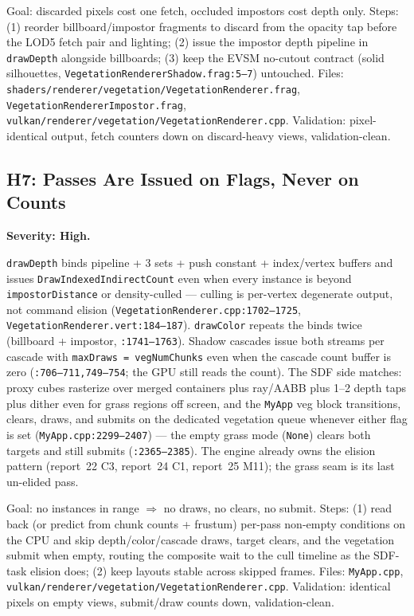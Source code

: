 \documentclass[11pt,a4paper]{article}
\begin{document}
\begin{tcolorbox}[promptbox={Prompt --- H6: cheap-first discard, impostor depth prepass}]
Goal: discarded pixels cost one fetch, occluded impostors cost depth only.
Steps: (1) reorder billboard/impostor fragments to discard from the opacity
tap before the LOD5 fetch pair and lighting; (2) issue the impostor depth
pipeline in \texttt{drawDepth} alongside billboards; (3) keep the EVSM
no-cutout contract (solid silhouettes, \texttt{VegetationRendererShadow.frag:5--7})
untouched. Files: \texttt{shaders/renderer/vegetation/VegetationRenderer.frag},
\texttt{VegetationRendererImpostor.frag},
\texttt{vulkan/renderer/vegetation/VegetationRenderer.cpp}. Validation:
pixel-identical output, fetch counters down on discard-heavy views,
validation-clean.
\end{tcolorbox}

\subsection{H7: Passes Are Issued on Flags, Never on Counts}

\textbf{Severity: High.}

\texttt{drawDepth} binds pipeline + 3 sets + push constant + index/vertex
buffers and issues \texttt{DrawIndexedIndirectCount} even when every
instance is beyond \texttt{impostorDistance} or density-culled --- culling
is per-vertex degenerate output, not command elision
(\texttt{VegetationRenderer.cpp:1702--1725},
\texttt{VegetationRenderer.vert:184--187}). \texttt{drawColor} repeats the
binds twice (billboard + impostor,
\texttt{:1741--1763}). Shadow cascades issue both streams per cascade with
\texttt{maxDraws = vegNumChunks} even when the cascade count buffer is zero
(\texttt{:706--711,749--754}; the GPU still reads the count). The SDF side
matches: proxy cubes rasterize over merged containers plus ray/AABB plus
1--2 depth taps plus dither even for grass regions off screen, and the
\texttt{MyApp} veg block transitions, clears, draws, and submits on the
dedicated vegetation queue whenever either flag is set
(\texttt{MyApp.cpp:2299--2407}) --- the empty grass mode (\texttt{None})
clears both targets and still submits (\texttt{:2365--2385}). The engine
already owns the elision pattern (report~22 C3, report~24 C1, report~25
M11); the grass seam is its last un-elided pass.

\begin{tcolorbox}[promptbox={Prompt --- H7: count-gated grass passes}]
Goal: no instances in range $\Rightarrow$ no draws, no clears, no submit.
Steps: (1) read back (or predict from chunk counts + frustum) per-pass
non-empty conditions on the CPU and skip depth/color/cascade draws,
target clears, and the vegetation submit when empty, routing the composite
wait to the cull timeline as the SDF-task elision does; (2) keep layouts
stable across skipped frames. Files: \texttt{MyApp.cpp},
\texttt{vulkan/renderer/vegetation/VegetationRenderer.cpp}. Validation:
identical pixels on empty views, submit/draw counts down, validation-clean.
\end{tcolorbox}
\end{document}
